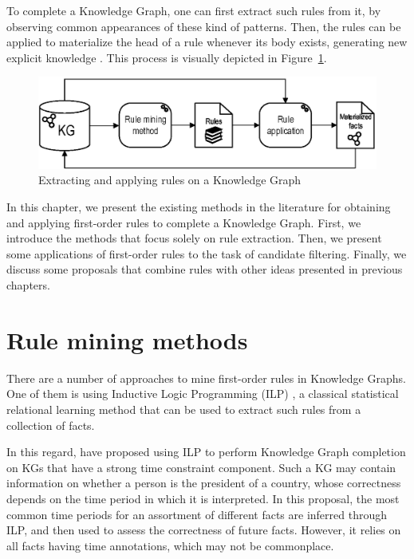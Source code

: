 To complete a Knowledge Graph, one can first extract such rules from it, by observing common appearances of these kind of patterns. Then, the rules can be applied to materialize the head of a rule whenever its body exists, generating new explicit knowledge \cite{stepanova2018}. This process is visually depicted in Figure~\ref{fig:rule-process}.

\begin{figure}[!htp]
    \centering
    \includegraphics[width=.85\textwidth]{fig/rules/rule_process}
    \caption{Extracting and applying rules on a Knowledge Graph}
    \label{fig:rule-process}
\end{figure}

In this chapter, we present the existing methods in the literature for obtaining and applying first-order rules to complete a Knowledge Graph. First, we introduce the methods that focus solely on rule extraction. Then, we present some applications of first-order rules to the task of candidate filtering. Finally, we discuss some proposals that combine rules with other ideas presented in previous chapters.

\section{Rule mining methods}\label{sec:rule-ilp}
There are a number of approaches to mine first-order rules in Knowledge Graphs. One of them is using Inductive Logic Programming (ILP) \cite{muggleton1994}, a classical statistical relational learning method that can be used to extract such rules from a collection of facts.

In this regard, \citet{jiang2016} have proposed using ILP to perform Knowledge Graph completion on KGs that have a strong time constraint component. Such a KG may contain information on whether a person is the president of a country, whose correctness depends on the time period in which it is interpreted. In this proposal, the most common time periods for an assortment of different facts are inferred through ILP, and then used to assess the correctness of future facts. However, it relies on all facts having time annotations, which may not be commonplace.

